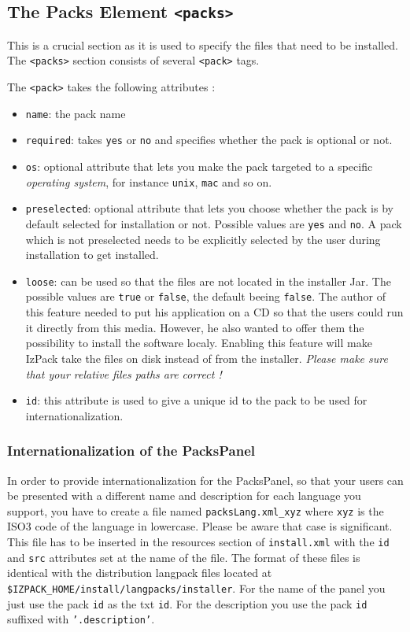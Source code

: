\subsection{The Packs Element \texttt{<packs>}}
\label{packs-element}

This is a crucial section as it is used to specify the files that need
to be installed. The \texttt{<packs>} section consists of several 
\texttt{<pack>} tags.

The \texttt{<pack>} takes the following attributes :
  \begin{itemize}
    \item \texttt{name}: the pack name
    \item \texttt{required}: takes \texttt{yes} or \texttt{no} and specifies
    whether the pack is optional or not.
    \item \texttt{os}: optional attribute that lets you make the pack targeted
    to a specific \textsl{operating system}, for instance \texttt{unix},
    \texttt{mac} and so on.
    \item \texttt{preselected}: optional attribute that lets you choose whether
    the pack is by default selected for installation or not. Possible values
    are \texttt{yes} and \texttt{no}. A pack which is not preselected needs to
    be explicitly selected by the user during installation to get installed.
    \item \texttt{loose}: can be used so that the files are not located in the
    installer Jar. The possible values are \texttt{true} or \texttt{false}, the
    default beeing \texttt{false}. The author of this feature needed to put his
    application on a CD so that the users could run it directly from this media.
    However, he also wanted to offer them the possibility to install the
    software localy. Enabling this feature will make IzPack take the files on
    disk instead of from the installer. \textit{Please make sure that your relative
    files paths are correct !}
    \item \texttt{id}: this attribute is used to give a unique id to the pack to
    be used for internationalization.
  \end{itemize}

\subsubsection{Internationalization of the PacksPanel}
In order to provide internationalization for the PacksPanel, so that your users can
be presented with a different name and description for each language you support,
 you have to create a file named \texttt{packsLang.xml\_xyz} where \texttt{xyz}
 is the ISO3 code of the language in lowercase. Please be aware that case is significant.
 This file has to be inserted in the resources section of \texttt{install.xml} with the
 \texttt{id} and \texttt{src} attributes set at the name of the file. The format of
 these files is identical with the distribution langpack files located at
 \texttt{\$IZPACK\_HOME/install/langpacks/installer}. For the name of the panel you just
 use the pack \texttt{id} as the txt \texttt{id}. For the description you use the pack
 \texttt{id} suffixed with \texttt{'.description'}.

